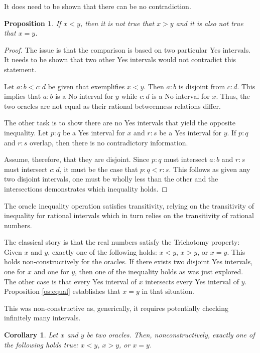 \documentclass[12pt]{article}
\newtheorem{corollary}{Corollary}[section]
\newtheorem{proposition}{Proposition}[section]
\begin{document}
It does need to be shown that there can be no contradiction. 

\begin{proposition}
    If $x < y$, then it is not true that $x > y$ and it is also not true that $x = y$.
\end{proposition}

\begin{proof}
    The issue is that the comparison is based on two particular Yes intervals. It needs to be shown that two other Yes intervals would not contradict this statement. 

    Let $a:b < c:d$ be given that exemplifies $x<y$. Then $a:b$ is disjoint from $c:d$. This implies that $a:b$ is a No interval for $y$ while $c:d$ is a No interval for $x$. Thus, the two oracles are not equal as their rational betweenness relations differ.

    The other task is to show there are no Yes intervals that yield the opposite inequality. Let $p:q$ be a Yes interval for $x$ and $r:s$ be a Yes interval for $y$. If $p:q$ and $r:s$ overlap, then there is no contradictory information. 

    Assume, therefore, that they are disjoint. Since $p:q$ must intersect $a:b$ and $r:s$ must intersect $c:d$, it must be the case that $p:q < r:s$. This follows as given any two disjoint intervals, one must be wholly less than the other and the intersections demonstrates which inequality holds. 

\end{proof}

The oracle inequality operation satisfies transitivity, relying on the transitivity of inequality for rational intervals which in turn relies on the transitivity of rational numbers. 

The classical story is that the real numbers satisfy the Trichotomy property: Given $x$ and $y$, exactly one of the following holds: $x<y$, $x>y$, or $x=y$. This holds non-constructively for the oracles. If there exists two disjoint Yes intervals, one for $x$ and one for $y$, then one of the inequality holds as was just explored. The other case is that every Yes interval of $x$ intersects every Yes interval of $y$. Proposition \ref{os:equal} establishes that $x=y$ in that situation. 
 

This was non-constructive as, generically, it requires potentially checking infinitely many intervals. 

\begin{corollary}
    Let $x$ and $y$ be two oracles. Then, nonconstructively, exactly one of the following holds true: $x<y$, $x>y$, or $x=y$.
\end{corollary}
\end{document}
